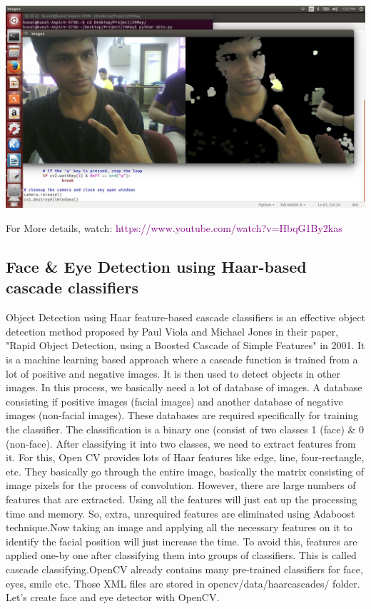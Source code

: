 \documentclass[a4paper,12pt]{article}
\begin{document}
\begin{center}
	\graphicspath{ {images/} }
	\includegraphics[width=15cm, height=7.5cm]{skin}
\end{center}

For More details, watch:
\newline
\textcolor{purple}{https://www.youtube.com/watch?v=HbqG1By2kas}

\subsection{Face \& Eye Detection using Haar-based cascade classifiers}

Object Detection using Haar feature-based cascade classifiers is an effective object detection method proposed by Paul Viola 
and Michael Jones in their paper, "Rapid Object Detection, using a Boosted Cascade of Simple Features" in 2001. It is a machine 
learning based approach where a cascade function is trained from a lot of positive and negative images. It is then used to detect 
objects in other images. In this process, we basically need a lot of database of images. A database consisting if positive images 
(facial images) and another database of negative images (non-facial images). These databases are required specifically for training 
the classifier. The classification is a binary one (consist of two classes 1 (face) \& 0 (non-face). After classifying it into two 
classes, we need to extract features from it. For this, Open CV provides lots of Haar features like edge, line, four-rectangle, etc. 
They basically go through the entire image, basically the matrix consisting of image pixels for the process of convolution. 
However, there are large numbers of features that are extracted. Using all the features will just eat up the processing time and memory.
So, extra, unrequired features are eliminated using Adaboost technique.Now taking an image and applying all the necessary features 
on it to identify the facial position will just increase the time. To avoid this, features are applied one-by one after classifying 
them into groups of classifiers. This is called cascade classifying.OpenCV already contains many pre-trained classifiers for face, 
eyes, smile etc. Those XML files are stored in opencv/data/haarcascades/ folder. Let's create face and eye detector with OpenCV.
\end{document}
